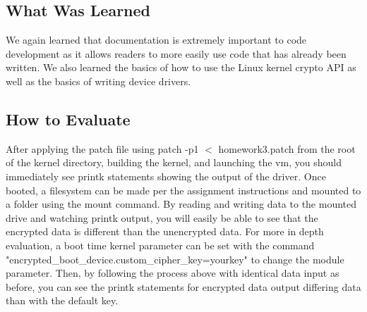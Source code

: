 \subsection{What Was Learned}
We again learned that documentation is extremely important to code development as it allows readers to more easily use code that has already been written. We also learned the basics of how to use the Linux kernel crypto API as well as the basics of writing device drivers. 

\subsection{How to Evaluate}
After applying the patch file using patch -p1 $<$ homework3.patch from the root of the kernel directory, building the kernel, and launching the vm, you should immediately see printk statements showing the output of the driver. Once booted, a filesystem can be made per the assignment instructions and mounted to a folder using the mount command. By reading and writing data to the mounted drive and watching printk output, you will easily be able to see that the encrypted data is different than the unencrypted data. For more in depth evaluation, a boot time kernel parameter can be set with the command "encrypted\_boot\_device.custom\_cipher\_key=yourkey" to change the module parameter. Then, by following the process above with identical data input as before, you can see the printk statements for encrypted data output differing data than with the default key.
